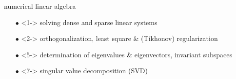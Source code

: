 \documentclass{beamer}
\begin{document}
\begin{frame}{numerical linear algebra}

\begin{itemize}
    \item[$\bullet$]<1-> solving dense and sparse linear systems
    \item[$\bullet$]<2-> orthogonalization, least square \& (Tikhonov) regularization
    \item[$\bullet$]<5-> determination of eigenvalues \& eigenvectors, invariant subspaces
    \item[$\bullet$]<7-> singular value decomposition (SVD)
\end{itemize}    





\end{frame}
\end{document}
